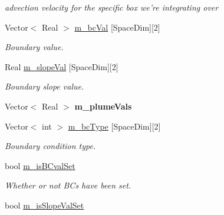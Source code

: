 \begin{DoxyCompactItemize}
\begin{DoxyCompactList}\small\item\em advection velocity for the specific box we're integrating over \end{DoxyCompactList}\item 
\hypertarget{class_advect_i_b_c_a8d828241433e76c184521c9ae489f078}{Vector$<$ Real $>$ \hyperlink{class_advect_i_b_c_a8d828241433e76c184521c9ae489f078}{m\-\_\-bc\-Val} \mbox{[}Space\-Dim\mbox{]}\mbox{[}2\mbox{]}}\label{class_advect_i_b_c_a8d828241433e76c184521c9ae489f078}

\begin{DoxyCompactList}\small\item\em Boundary value. \end{DoxyCompactList}\item 
\hypertarget{class_advect_i_b_c_a4f7653572eab6fea3ad343517b9f87c6}{Real \hyperlink{class_advect_i_b_c_a4f7653572eab6fea3ad343517b9f87c6}{m\-\_\-slope\-Val} \mbox{[}Space\-Dim\mbox{]}\mbox{[}2\mbox{]}}\label{class_advect_i_b_c_a4f7653572eab6fea3ad343517b9f87c6}

\begin{DoxyCompactList}\small\item\em Boundary slope value. \end{DoxyCompactList}\item 
\hypertarget{class_advect_i_b_c_a690ab64b62ebfc1757ec94dc93706516}{Vector$<$ Real $>$ {\bfseries m\-\_\-plume\-Vals}}\label{class_advect_i_b_c_a690ab64b62ebfc1757ec94dc93706516}

\item 
\hypertarget{class_advect_i_b_c_aa2a891f499c8d490a7ac7531a33a5d85}{Vector$<$ int $>$ \hyperlink{class_advect_i_b_c_aa2a891f499c8d490a7ac7531a33a5d85}{m\-\_\-bc\-Type} \mbox{[}Space\-Dim\mbox{]}\mbox{[}2\mbox{]}}\label{class_advect_i_b_c_aa2a891f499c8d490a7ac7531a33a5d85}

\begin{DoxyCompactList}\small\item\em Boundary condition type. \end{DoxyCompactList}\item 
\hypertarget{class_advect_i_b_c_a3efbc8664456083ae4d71de9a7b17312}{bool \hyperlink{class_advect_i_b_c_a3efbc8664456083ae4d71de9a7b17312}{m\-\_\-is\-B\-Cval\-Set}}\label{class_advect_i_b_c_a3efbc8664456083ae4d71de9a7b17312}

\begin{DoxyCompactList}\small\item\em Whether or not B\-Cs have been set. \end{DoxyCompactList}\item 
\hypertarget{class_advect_i_b_c_afd9c2bb5aa7834ea549538f060857ba9}{bool \hyperlink{class_advect_i_b_c_afd9c2bb5aa7834ea549538f060857ba9}{m\-\_\-is\-Slope\-Val\-Set}}\label{class_advect_i_b_c_afd9c2bb5aa7834ea549538f060857ba9}


\end{DoxyCompactItemize}
